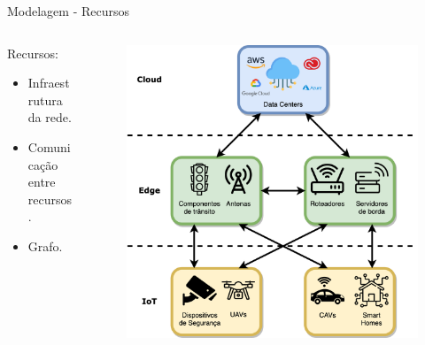 
\begin{frame}{Modelagem - Recursos}
    \begin{columns}[T]
        \begin{column}{.5\textwidth}
            Recursos:
            \begin{itemize}
                \item Infraestrutura da rede.
                \item Comunicação entre recursos.
                \item Grafo.
            \end{itemize}
        \end{column}

        \begin{column}{.5\textwidth}
            \begin{figure}
                \centering
                \includegraphics[width=\textwidth]{Figuras/TCC Edge Cloud IoT.png}
            \end{figure}
        \end{column}
    \end{columns}
\end{frame}


